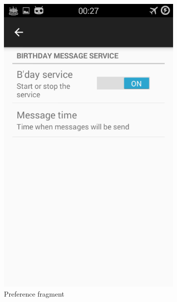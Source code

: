 \begin{figure}[ht]
    \centering
    \begin{subfigure}[b]{0.35\textwidth}
        \includegraphics[width=\textwidth]{./img/7.png}
        \caption{Preference fragment}
        \label{fig:preferance_fragment}
    \end{subfigure}
    \begin{subfigure}[b]{0.35\textwidth}

\end{subfigure}
\end{figure}
